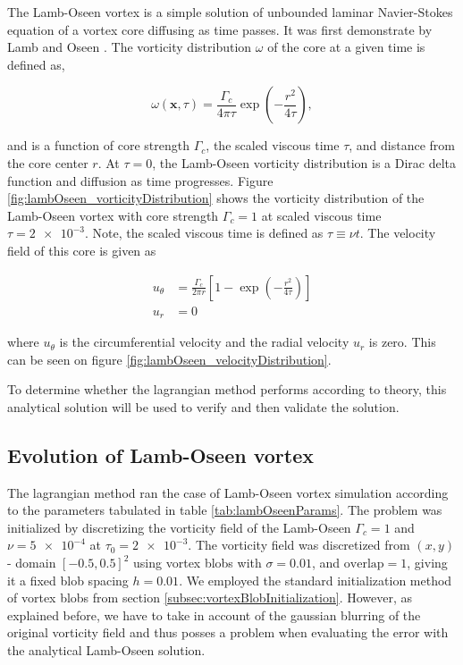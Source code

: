 The Lamb-Oseen vortex is a simple solution of unbounded laminar Navier-Stokes equation of a vortex core diffusing as time passes. It was first demonstrate by Lamb \cite{} and Oseen \cite{}. The vorticity distribution $\omega$ of the core at a given time is defined as,

	\begin{equation}
	\omega\left(\mathbf{x},\tau\right) = \frac{\Gamma_c}{4\pi\tau} \exp\left(-\frac{r^2}{4\tau}\right),
	\end{equation}

and is a function of core strength $\Gamma_c$, the scaled viscous time $\tau$, and distance from the core center $r$. At $\tau=0$, the Lamb-Oseen vorticity distribution is a Dirac delta function and diffusion as time progresses. Figure \ref{fig:lambOseen_vorticityDistribution} shows the vorticity distribution of the Lamb-Oseen vortex with core strength $\Gamma_c=1$ at scaled viscous time $\tau=\num{2e-3}$. Note, the scaled viscous time is defined as $\tau \equiv \nu t$. The velocity field of this core is given as 

	\begin{subequations}
	\begin{align}
	u_{\theta} &= \frac{\Gamma_c}{2\pi r} \left[1-\exp\left(-\frac{r^2}{4\tau}\right)\right]\\
	u_r &= 0
	\end{align}
	\end{subequations}

where $u_{\theta}$ is the circumferential velocity and the radial velocity $u_r$ is zero. This can be seen on figure \ref{fig:lambOseen_velocityDistribution}. 

To determine whether the lagrangian method performs according to theory, this analytical solution will be used to verify and then validate the solution.

\subsection{Evolution of Lamb-Oseen vortex}

The lagrangian method ran the case of Lamb-Oseen vortex simulation according to the parameters tabulated in table \ref{tab:lambOseenParams}. The problem was initialized by discretizing the vorticity field of the Lamb-Oseen $\Gamma_c=1$ and $\nu=\num{5e-4}$ at $\tau_0 = \num{2e-3}$. The vorticity field was discretized from $(x,y)$ - domain $\left[-0.5,0.5\right]^2$ using vortex blobs with $\sigma=0.01$, and $\mathrm{overlap}=1$, giving it a fixed blob spacing $h=0.01$. We employed the standard initialization method of vortex blobs from section \ref{subsec:vortexBlobInitialization}. However, as explained before, we have to take in account of the gaussian blurring of the original vorticity field and thus posses a problem when evaluating the error with the analytical Lamb-Oseen solution.

